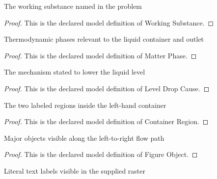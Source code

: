 \begin{definition}
  \label{def:physics:phyx-mini-0445:phyxminiproblems-problemphyxmini0445-workingsubstance}
  The working substance named in the problem
\end{definition}
\begin{proof}
  This is the declared model definition of Working Substance.
\end{proof}
\begin{definition}
  \label{def:physics:phyx-mini-0445:phyxminiproblems-problemphyxmini0445-matterphase}
  Thermodynamic phases relevant to the liquid container and outlet
\end{definition}
\begin{proof}
  This is the declared model definition of Matter Phase.
\end{proof}
\begin{definition}
  \label{def:physics:phyx-mini-0445:phyxminiproblems-problemphyxmini0445-leveldropcause}
  The mechanism stated to lower the liquid level
\end{definition}
\begin{proof}
  This is the declared model definition of Level Drop Cause.
\end{proof}
\begin{definition}
  \label{def:physics:phyx-mini-0445:phyxminiproblems-problemphyxmini0445-containerregion}
  The two labeled regions inside the left-hand container
\end{definition}
\begin{proof}
  This is the declared model definition of Container Region.
\end{proof}
\begin{definition}
  \label{def:physics:phyx-mini-0445:phyxminiproblems-problemphyxmini0445-figureobject}
  Major objects visible along the left-to-right flow path
\end{definition}
\begin{proof}
  This is the declared model definition of Figure Object.
\end{proof}
\begin{definition}
  \label{def:physics:phyx-mini-0445:phyxminiproblems-problemphyxmini0445-figuretextlabel}
  Literal text labels visible in the supplied raster
\end{definition}
